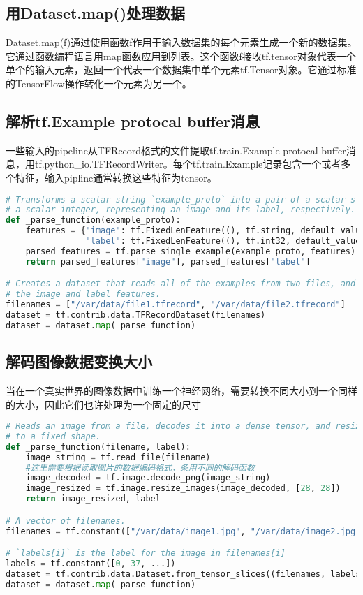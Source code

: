 \subsection{用Dataset.map()处理数据}
Dataset.map(f)通过使用函数f作用于输入数据集的每个元素生成一个新的数据集。它通过函数编程语言用map函数应用到列表。这个函数f接收tf.tensor对象代表一个单个的输入元素，返回一个代表一个数据集中单个元素tf.Tensor对象。它通过标准的TensorFlow操作转化一个元素为另一个。
\subsection{解析tf.Example protocal buffer消息}
一些输入的pipeline从TFRecord格式的文件提取tf.train.Example protocal buffer消息，用tf.python\_io.TFRecordWriter。每个tf.train.Example记录包含一个或者多个特征，输入pipline通常转换这些特征为tensor。
\begin{lstlisting}[language=Python]
# Transforms a scalar string `example_proto` into a pair of a scalar string and
# a scalar integer, representing an image and its label, respectively.
def _parse_function(example_proto):
    features = {"image": tf.FixedLenFeature((), tf.string, default_value=""),
                "label": tf.FixedLenFeature((), tf.int32, default_value=0)}
    parsed_features = tf.parse_single_example(example_proto, features)
    return parsed_features["image"], parsed_features["label"]

# Creates a dataset that reads all of the examples from two files, and extracts
# the image and label features.
filenames = ["/var/data/file1.tfrecord", "/var/data/file2.tfrecord"]
dataset = tf.contrib.data.TFRecordDataset(filenames)
dataset = dataset.map(_parse_function)
\end{lstlisting}
\subsection{解码图像数据变换大小}
当在一个真实世界的图像数据中训练一个神经网络，需要转换不同大小到一个同样的大小，因此它们也许处理为一个固定的尺寸
\begin{lstlisting}[language=Python]
# Reads an image from a file, decodes it into a dense tensor, and resizes it
# to a fixed shape.
def _parse_function(filename, label):
    image_string = tf.read_file(filename)
    #这里需要根据读取图片的数据编码格式，条用不同的解码函数
    image_decoded = tf.image.decode_png(image_string)
    image_resized = tf.image.resize_images(image_decoded, [28, 28])
    return image_resized, label

# A vector of filenames.
filenames = tf.constant(["/var/data/image1.jpg", "/var/data/image2.jpg", ...])

# `labels[i]` is the label for the image in filenames[i]
labels = tf.constant([0, 37, ...])
dataset = tf.contrib.data.Dataset.from_tensor_slices((filenames, labels))
dataset = dataset.map(_parse_function)
\end{lstlisting}
